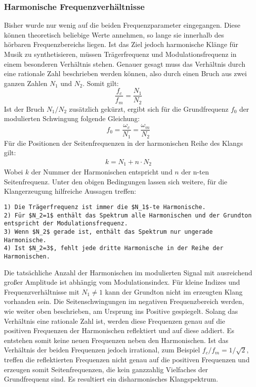 \subsubsection{Harmonische Frequenzverhältnisse}
Bisher wurde nur wenig auf die beiden Frequenzparameter eingegangen. Diese können theoretisch beliebige Werte annehmen, so lange sie innerhalb des hörbaren Frequenzbereichs liegen. Ist das Ziel jedoch harmonische Klänge für Musik zu synthetisieren, müssen Trägerfrequenz und Modulationsfrequenz in einem besonderen Verhältnis stehen. Genauer gesagt muss das Verhältnis durch eine rationale Zahl beschrieben werden können, also durch einen Bruch aus zwei ganzen Zahlen $N_1$ und $N_2$. Somit gilt:
\begin{equation*}
\frac{f_c}{f_m}=\frac{N_1}{N_2}
\end{equation*}
Ist der Bruch $N_1/N_2$ zusätzlich gekürzt, ergibt sich für die Grundfrequenz $f_0$ der modulierten Schwingung folgende Gleichung:
\begin{equation*}
f_0=\frac{\omega_c}{N_1}=\frac{\omega_m}{N_2}
\end{equation*}
Für die Positionen der Seitenfrequenzen in der harmonischen Reihe des Klangs gilt:
\begin{align}
k=N_1+n\cdot N_2
\end{align}
Wobei $k$ der Nummer der Harmonischen entspricht und $n$ der n-ten Seitenfrequenz. Unter den obigen Bedingungen lassen sich weitere, für die Klangerzeugung hilfreiche Aussagen treffen: \cite{chowningPaper}
\begin{lstlisting}[mathescape]
1) Die Trägerfrequenz ist immer die $N_1$-te Harmonische.
2) Für $N_2=1$ enthält das Spektrum alle Harmonischen und der Grundton entspricht der Modulationsfrequenz.
3) Wenn $N_2$ gerade ist, enthält das Spektrum nur ungerade Harmonische.
4) Ist $N_2=3$, fehlt jede dritte Harmonische in der Reihe der Harmonischen.
\end{lstlisting}
Die tatsächliche Anzahl der Harmonischen im modulierten Signal mit ausreichend großer Amplitude ist abhängig vom Modulationsindex. Für kleine Indizes und Frequenzverhältnisse mit $N_1\neq1$ kann der Grundton nicht im erzeugten Klang vorhanden sein. Die Seitenschwingungen im negativen Frequenzbereich werden, wie weiter oben beschrieben, am Ursprung ins Positive gespiegelt. Solang das Verhältnis eine rationale Zahl ist, werden diese Frequenzen genau auf die positiven Frequenzen der Harmonischen reflektiert und auf diese addiert.
Es entstehen somit keine neuen Frequenzen neben den Harmonischen. Ist das Verhältnis der beiden Frequenzen jedoch irrational, 
zum Beispiel $f_c/f_m=1/\sqrt{2}$, treffen die reflektierten Frequenzen nicht genau auf die positiven Frequenzen und erzeugen somit Seitenfrequenzen, die kein ganzzahlig Vielfaches der Grundfrequenz sind. Es resultiert ein disharmonisches Klangspektrum.

